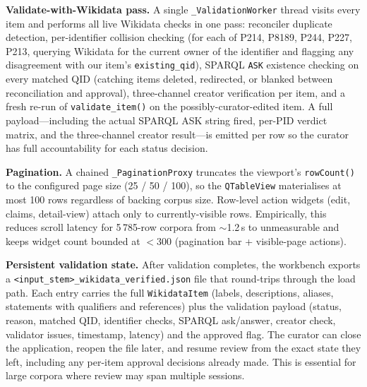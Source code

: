 \documentclass[Afour,sageh,times]{sagej}
\newcommand{\code}[1]{\texttt{#1}}
\begin{document}
\textbf{Validate-with-Wikidata pass.} A single \code{\_ValidationWorker} thread visits every item and performs all live Wikidata checks in one pass: reconciler duplicate detection, per-identifier collision checking (for each of P214, P8189, P244, P227, P213, querying Wikidata for the current owner of the identifier and flagging any disagreement with our item's \code{existing\_qid}), SPARQL \code{ASK} existence checking on every matched QID (catching items deleted, redirected, or blanked between reconciliation and approval), three-channel creator verification per item, and a fresh re-run of \code{validate\_item()} on the possibly-curator-edited item. A full payload---including the actual SPARQL ASK string fired, per-PID verdict matrix, and the three-channel creator result---is emitted per row so the curator has full accountability for each status decision.

\textbf{Pagination.} A chained \code{\_PaginationProxy} truncates the viewport's \code{rowCount()} to the configured page size (25 / 50 / 100), so the \code{QTableView} materialises at most 100 rows regardless of backing corpus size. Row-level action widgets (edit, claims, detail-view) attach only to currently-visible rows. Empirically, this reduces scroll latency for 5\,785-row corpora from $\sim$1.2\,s to unmeasurable and keeps widget count bounded at $< 300$ (pagination bar + visible-page actions).

\textbf{Persistent validation state.} After validation completes, the workbench exports a \code{<input\_stem>\_wikidata\_verified.json} file that round-trips through the load path. Each entry carries the full \code{WikidataItem} (labels, descriptions, aliases, statements with qualifiers and references) plus the validation payload (status, reason, matched QID, identifier checks, SPARQL ask/answer, creator check, validator issues, timestamp, latency) and the approved flag. The curator can close the application, reopen the file later, and resume review from the exact state they left, including any per-item approval decisions already made. This is essential for large corpora where review may span multiple sessions.
\end{document}
